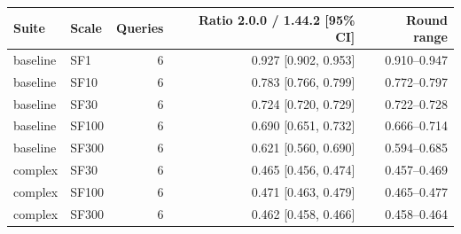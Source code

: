 \begin{tabular}{llrrr}
\toprule
Suite & Scale & Queries & Ratio 2.0.0 / 1.44.2 [95\% CI] & Round range \\
\midrule
baseline & SF1 & 6 & 0.927 [0.902, 0.953] & 0.910--0.947 \\
baseline & SF10 & 6 & 0.783 [0.766, 0.799] & 0.772--0.797 \\
baseline & SF30 & 6 & 0.724 [0.720, 0.729] & 0.722--0.728 \\
baseline & SF100 & 6 & 0.690 [0.651, 0.732] & 0.666--0.714 \\
baseline & SF300 & 6 & 0.621 [0.560, 0.690] & 0.594--0.685 \\
complex & SF30 & 6 & 0.465 [0.456, 0.474] & 0.457--0.469 \\
complex & SF100 & 6 & 0.471 [0.463, 0.479] & 0.465--0.477 \\
complex & SF300 & 6 & 0.462 [0.458, 0.466] & 0.458--0.464 \\
\bottomrule
\end{tabular}
